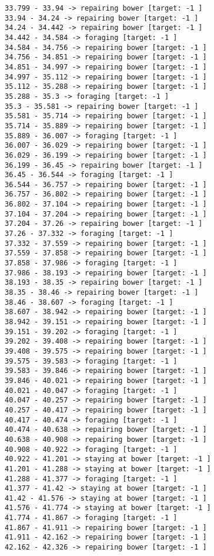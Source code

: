 \documentclass[11pt]{article}
\begin{document}
\begin{Verbatim}[commandchars=\\\{\}]
33.799 - 33.94 -> repairing bower [target: -1 ]
33.94 - 34.24 -> repairing bower [target: -1 ]
34.24 - 34.442 -> repairing bower [target: -1 ]
34.442 - 34.584 -> foraging [target: -1 ]
34.584 - 34.756 -> repairing bower [target: -1 ]
34.756 - 34.851 -> repairing bower [target: -1 ]
34.851 - 34.997 -> repairing bower [target: -1 ]
34.997 - 35.112 -> repairing bower [target: -1 ]
35.112 - 35.288 -> repairing bower [target: -1 ]
35.288 - 35.3 -> foraging [target: -1 ]
35.3 - 35.581 -> repairing bower [target: -1 ]
35.581 - 35.714 -> repairing bower [target: -1 ]
35.714 - 35.889 -> repairing bower [target: -1 ]
35.889 - 36.007 -> foraging [target: -1 ]
36.007 - 36.029 -> repairing bower [target: -1 ]
36.029 - 36.199 -> repairing bower [target: -1 ]
36.199 - 36.45 -> repairing bower [target: -1 ]
36.45 - 36.544 -> foraging [target: -1 ]
36.544 - 36.757 -> repairing bower [target: -1 ]
36.757 - 36.802 -> repairing bower [target: -1 ]
36.802 - 37.104 -> repairing bower [target: -1 ]
37.104 - 37.204 -> repairing bower [target: -1 ]
37.204 - 37.26 -> repairing bower [target: -1 ]
37.26 - 37.332 -> foraging [target: -1 ]
37.332 - 37.559 -> repairing bower [target: -1 ]
37.559 - 37.858 -> repairing bower [target: -1 ]
37.858 - 37.986 -> foraging [target: -1 ]
37.986 - 38.193 -> repairing bower [target: -1 ]
38.193 - 38.35 -> repairing bower [target: -1 ]
38.35 - 38.46 -> repairing bower [target: -1 ]
38.46 - 38.607 -> foraging [target: -1 ]
38.607 - 38.942 -> repairing bower [target: -1 ]
38.942 - 39.151 -> repairing bower [target: -1 ]
39.151 - 39.202 -> foraging [target: -1 ]
39.202 - 39.408 -> repairing bower [target: -1 ]
39.408 - 39.575 -> repairing bower [target: -1 ]
39.575 - 39.583 -> foraging [target: -1 ]
39.583 - 39.846 -> repairing bower [target: -1 ]
39.846 - 40.021 -> repairing bower [target: -1 ]
40.021 - 40.047 -> foraging [target: -1 ]
40.047 - 40.257 -> repairing bower [target: -1 ]
40.257 - 40.417 -> repairing bower [target: -1 ]
40.417 - 40.474 -> foraging [target: -1 ]
40.474 - 40.638 -> repairing bower [target: -1 ]
40.638 - 40.908 -> repairing bower [target: -1 ]
40.908 - 40.922 -> foraging [target: -1 ]
40.922 - 41.201 -> staying at bower [target: -1 ]
41.201 - 41.288 -> staying at bower [target: -1 ]
41.288 - 41.377 -> foraging [target: -1 ]
41.377 - 41.42 -> staying at bower [target: -1 ]
41.42 - 41.576 -> staying at bower [target: -1 ]
41.576 - 41.774 -> staying at bower [target: -1 ]
41.774 - 41.867 -> foraging [target: -1 ]
41.867 - 41.911 -> repairing bower [target: -1 ]
41.911 - 42.162 -> repairing bower [target: -1 ]
42.162 - 42.326 -> repairing bower [target: -1 ]

\end{Verbatim}
\end{document}
